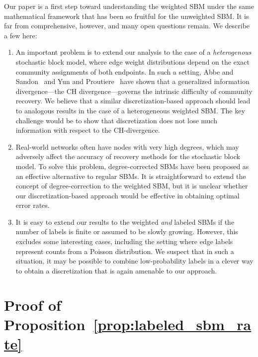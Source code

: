 \documentclass{article}
\begin{document}
Our paper is a first step toward understanding the weighted SBM under the same mathematical framework that has been so fruitful for the unweighted SBM. It is far from comprehensive, however, and many open questions remain. We describe a few here:
\begin{enumerate}
\item An important problem is to extend our analysis to the case of a \emph{heterogenous} stochastic block model, where edge weight distributions depend on the exact community assignments of both endpoints. In such a setting, Abbe and Sandon~\cite{AbbSan15} and Yun and Proutiere~\cite{yun2016optimal} have shown that a generalized information divergence---the CH divergence---governs the intrinsic difficulty of community recovery. We believe that a similar discretization-based approach should lead to analogous results in the case of a heterogeneous weighted SBM. The key challenge would be to show that discretization does not lose much information with respect to the CH-divergence.
\item Real-world networks often have nodes with very high degrees, which may adversely affect the accuracy of recovery methods for the stochastic block model. To solve this problem, degree-corrected SBMs \cite{zhao2012consistency, gao2016community} have been proposed as an effective alternative to regular SBMs. It is straightforward to extend the concept of degree-correction to the weighted SBM, but it is unclear whether our discretization-based approach would be effective in obtaining optimal error rates.
\item It is easy to extend our results to the weighted \emph{and} labeled SBMs if the number of labels is finite or assumed to be slowly growing. However, this excludes some interesting cases, including the setting where edge labels represent counts  from a Poisson distribution. We suspect that in such a situation, it may be possible to combine low-probability labels in a clever way to obtain a discretization that is again amenable to our approach. 
\end{enumerate}






\appendix

\section{Proof of Proposition~\ref{prop:labeled_sbm_rate}}
\label{appendix: first}
\end{document}
